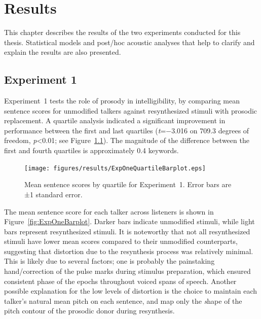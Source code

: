 \chapter{Results\label{chap:Results}}
This chapter describes the results of the two experiments conducted for this thesis.  Statistical models and post\-/hoc acoustic analyses that help to clarify and explain the results are also presented.

\section{Experiment 1}
Experiment~1 tests the role of prosody in intelligibility, by comparing mean sentence scores for unmodified talkers against resynthesized stimuli with prosodic replacement.  A quartile analysis indicated a significant improvement in performance between the first and last quartiles (\textit{t}=−3.016 on 709.3 degrees of freedom, \textit{p}<0.01; see Figure~\ref{fig:ExpOneQuartile}).  The magnitude of the difference between the first and fourth quartiles is approximately 0.4 keywords.

\begin{figure}[bt]
	\begin{centering}
	\texttt{[image: figures/results/ExpOneQuartileBarplot.eps]}
	\caption[Mean sentence scores by quartile for Experiment~1]{Mean sentence scores by quartile for Experiment~1.  Error bars are ±1 standard error.\label{fig:ExpOneQuartile}}
	\end{centering}
\end{figure}

The mean sentence score for each talker across listeners is shown in Figure~\ref{fig:ExpOneBarplot}.  Darker bars indicate unmodified stimuli, while light bars represent resynthesized stimuli.  It is noteworthy that not all resynthesized stimuli have lower mean scores compared to their unmodified counterparts, suggesting that distortion due to the resynthesis process was relatively minimal.  This is likely due to several factors; one is probably the painstaking hand\-/correction of the pulse marks during stimulus preparation, which ensured consistent phase of the \fo{} epochs throughout voiced spans of speech.  Another possible explanation for the low levels of distortion is the choice to maintain each talker’s natural mean pitch on each sentence, and map only the {\emph shape} of the pitch contour of the prosodic donor during resynthesis.  

